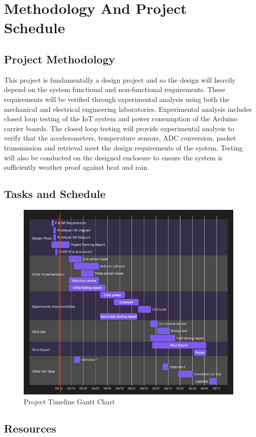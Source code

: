 \section{Methodology And Project Schedule}
\subsection{Project Methodology}
This project is fundamentally a design project and so the design will heavily depend on the system functional and non-functional requirements. These requirements will be verified through experimental analysis using both the mechanical and electrical engineering laboratories. Experimental analysis includes closed loop testing of the IoT system and power consumption of the Arduino carrier boards. The closed loop testing will provide experimental analysis to verify that the accelerometers, temperature sensors, ADC conversion, packet transmission and retrieval meet the design requirements of the system. Testing will also be conducted on the designed enclosure to ensure the system is sufficiently weather proof against heat and rain.  
\newpage
\subsection{Tasks and Schedule}

\begin{figure}[h!]
\center
\includegraphics[scale=0.8]{Images/Gantt-Chart.png}
\caption{Project Timeline Gantt Chart}
\label{fig:GanttChart}
\end{figure}

\subsection{Resources}